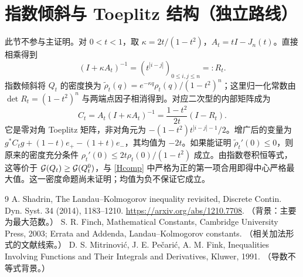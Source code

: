 \documentclass[11pt,a4paper,fontset=fandol]{ctexart}
\begin{document}
\section{指数倾斜与 Toeplitz 结构（独立路线）}
此节不参与主证明。对 $0<t<1$，取 $\kappa=2t/(1-t^2)$，$A_t=tI-J_n(t)$。直接相乘得到
\[(I+\kappa A_t)^{-1}=(t^{|i-j|})_{0\le i,j\le n}=:R_t.\]
指数倾斜将 $Q_t$ 的密度换为 $\widetilde\rho_t(q)=e^{-\kappa q}\rho_t(q)/(1-t^2)^n$；这里归一化常数由 $\det R_t=(1-t^2)^n$ 与两端点因子相消得到。对应二次型的内部矩阵成为
\[C_t=A_t(I+\kappa A_t)^{-1}=\frac{1-t^2}{2t}(I-R_t).\]
它是零对角 Toeplitz 矩阵，非对角元为 $-(1-t^2)t^{|i-j|-1}/2$。增广后的变量为 $g^*C_tg+(1-t)e_+-(1+t)e_-$，其均值为 $-2t$。如果能证明 $\widetilde\rho_t'(0)\le0$，则原来的密度充分条件 $\rho_t'(0)\le2t\rho_t(0)/(1-t^2)$ 成立。由指数卷积恒等式，这等价于 $\mathcal G(Q_t)\ge\mathcal G(Q_t^0)$，与 \eqref{Hcomp} 中严格为正的第一项合用即得中心严格最大值。这一密度命题尚未证明；均值为负不保证它成立。
\begin{thebibliography}{9}
 A. Shadrin, The Landau--Kolmogorov inequality revisited, Discrete Contin. Dyn. Syst. 34 (2014), 1183--1210. \url{https://arxiv.org/abs/1210.7708}. （背景：主要为最大范数。）
 S. R. Finch, Mathematical Constants, Cambridge University Press, 2003; Errata and Addenda, Landau--Kolmogorov constants. （相关加法形式的文献线索。）
 D. S. Mitrinovi\'c, J. E. Pe\v cari\'c, A. M. Fink, Inequalities Involving Functions and Their Integrals and Derivatives, Kluwer, 1991. （导数不等式背景。）
\end{thebibliography}
\end{document}
